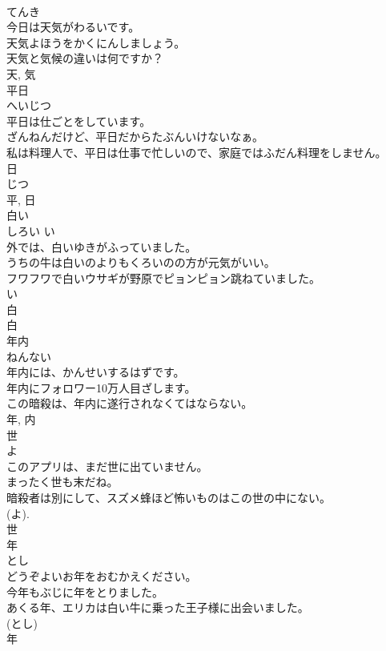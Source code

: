 \documentclass[8pt]{extreport}
\begin{document}
\begin{CJK}{UTF8}{min}
\\	てんき	
\\	今日は天気がわるいです。	
\\	天気よほうをかくにんしましょう。	
\\	天気と気候の違いは何ですか？	
\\	天, 気	
\\	平日	
\\	へいじつ	
\\	平日は仕ごとをしています。	
\\	ざんねんだけど、平日だからたぶんいけないなぁ。	
\\	私は料理人で、平日は仕事で忙しいので、家庭ではふだん料理をしません。	
\\	日 
\\	じつ 
\\	平, 日	
\\	白い	
\\	しろい	い 
\\	外では、白いゆきがふっていました。	
\\	うちの牛は白いのよりもくろいのの方が元気がいい。	
\\	フワフワで白いウサギが野原でピョンピョン跳ねていました。	
\\	い 
\\	白 
\\	白	
\\	年内	
\\	ねんない	
\\	年内には、かんせいするはずです。	
\\	年内にフォロワー10万人目ざします。	
\\	この暗殺は、年内に遂行されなくてはならない。	
\\	年, 内	
\\	世	
\\	よ	
\\	このアプリは、まだ世に出ていません。	
\\	まったく世も末だね。	
\\	暗殺者は別にして、スズメ蜂ほど怖いものはこの世の中にない。	
\\	(よ).
\\	世	
\\	年	
\\	とし	
\\	どうぞよいお年をおむかえください。	
\\	今年もぶじに年をとりました。	
\\	あくる年、エリカは白い牛に乗った王子様に出会いました。	
\\	(とし) 
\\	年	

\end{CJK}
\end{document}
